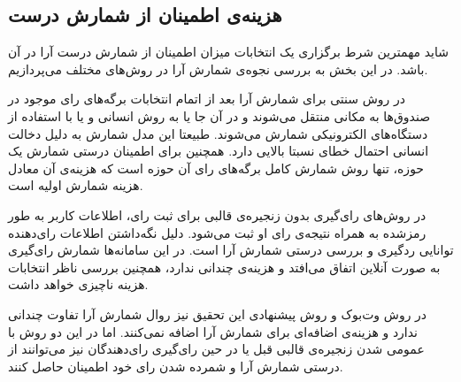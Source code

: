 \subsection{هزینه‌ی اطمینان از شمارش درست}
شاید مهمترین شرط برگزاری یک انتخابات میزان اطمینان از شمارش درست آرا در آن‌ باشد. در این بخش به بررسی نجوه‌ی شمارش آرا در روش‌های مختلف می‌پردازیم. 
\par
در روش سنتی برای شمارش آرا بعد از اتمام انتخابات برگه‌های رای‌ موجود در صندوق‌ها به مکانی منتقل می‌شوند و در آن‌ جا یا به روش انسانی و یا با استفاده از دستگاه‌های الکترونیکی شمارش می‌شوند. طبیعتا این مدل شمارش به دلیل دخالت انسانی احتمال خطای نسبتا بالایی دارد. همچنین برای اطمینان درستی شمارش یک حوزه، تنها روش شمارش کامل برگه‌های رای‌ آن حوزه است که هزینه‌ی آن معادل هزینه شمارش اولیه است. 
\par 
در روش‌های رای‌گیری بدون زنجیره‌ی قالبی برای ثبت رای، اطلاعات کاربر به طور رمزشده به همراه نتیجه‌ی رای‌ او ثبت می‌شود. دلیل نگه‌داشتن اطلاعات رای‌دهنده توانایی رد‌گیری و بررسی درستی شمارش آرا است. در این سامانه‌ها شمارش رای‌گیری به صورت آنلاین اتفاق می‌افتد و هزینه‌ی چندانی ندارد، همچنین بررسی ناظر انتخابات هزینه‌ ناچیزی خواهد داشت. 
\par 
در روش وت‌بوک و روش پیشنهادی این تحقیق نیز روال شمارش آرا تفاوت چندانی ندارد و هزینه‌ی اضافه‌ای برای شمارش آرا اضافه نمی‌کنند. اما در این دو روش با عمومی شدن زنجیره‌ی قالبی قبل یا در حین رای‌گیری رای‌دهندگان نیز می‌توانند از درستی شمارش آرا و شمرده شدن رای خود اطمینان حاصل کنند. 
